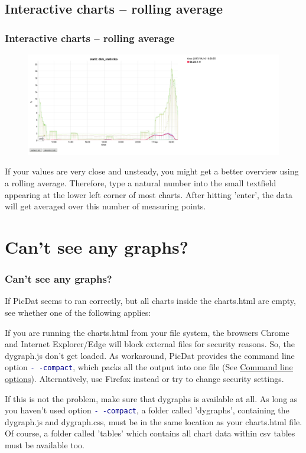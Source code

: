 \documentclass[8pt]{beamer}
\begin{document}
\subsection{Interactive charts -- rolling average}
\begin{frame}
\frametitle{Interactive charts -- rolling average} 
\begin{figure}
	\includegraphics[width=\textwidth]{../images/PicDat_roller.png}
\end{figure}

If your values are very close and unsteady, you might get a better overview using a rolling average. Therefore, type a natural number into the small textfield appearing at the lower left corner of most charts. After hitting 'enter', the data will get averaged over this number of measuring points.
\end{frame}

\section{Can't see any graphs?}
\begin{frame}
\frametitle{Can't see any graphs?}
If PicDat seems to ran correctly, but all charts inside the charts.html are empty, see whether one of the following applies:
\bigskip

If you are running the charts.html from your file system, the browsers Chrome and Internet Explorer/Edge will block external files for security reasons. So, the dygraph.js don't get loaded. As workaround, PicDat provides the command line option \textcolor{darkblue}{\texttt{-\,-compact}}, which packs all the output into one file (See \hyperref[options]{\underline{Command line options}}). Alternatively, use Firefox instead or try to change security settings.
\bigskip

If this is not the problem, make sure that dygraphs is available at all. As long as you haven't used option \textcolor{darkblue}{\texttt{-\,-compact}}, a folder called 'dygraphs', containing the dygraph.js and dygraph.css, must be in the same location as your charts.html file. Of course, a folder called 'tables' which contains all chart data within csv tables must be available too.
\end{frame}
\end{document}
